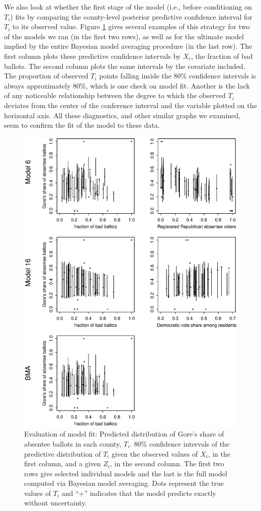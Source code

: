 \documentclass[11pt,titlepage]{article}
\begin{document}
We also look at whether the first stage of the model (i.e., before
conditioning on $T_i$) fits by comparing the county-level posterior
predictive confidence interval for $T_i$ to its observed value.
Figure \ref{fg:fit} gives several examples of this strategy for two of
the models we ran (in the first two rows), as well as for the ultimate
model implied by the entire Bayesian model averaging procedure (in the
last row).  The first column plots these predictive confidence
intervals by $X_i$, the fraction of bad ballots.  The second column
plots the same intervals by the covariate included.  The proportion of
observed $T_i$ points falling inside the 80\% confidence intervals is
always approximately 80\%, which is one check on model fit.  Another
is the lack of any noticeable relationship between the degree to which
the observed $T_i$ deviates from the center of the conference interval
and the variable plotted on the horizontal axis.  All these
diagnostics, and other similar graphs we examined, seem to confirm the
fit of the model to these data.
\begin{figure}[t!]
\begin{center}
\includegraphics[width=4.5in,height=6in]{fit}
\caption{Evaluation of model fit: Predicted distribution of
  Gore's share of absentee ballots in each county, $T_i$. 80\%
  confidence intervals of the predictive distribution of $T_i$ given
  the observed values of $X_i$, in the first column, and a given
  $Z_i$, in the second column.  The first two rows give selected
  individual models and the last is the full model computed via
  Bayesian model averaging.  Dots represent the true values of $T_i$
  and ``+'' indicates that the model predicts exactly without
  uncertainty.}
\label{fg:fit}
\end{center} 
\end{figure}
\end{document}
